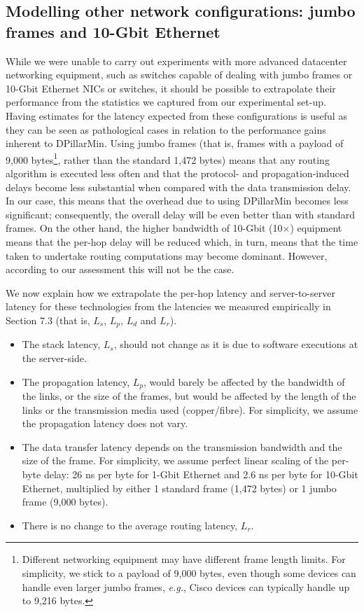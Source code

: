 \documentclass{article}
\newcounter{fig}
\begin{document}
\subsection{Modelling other network configurations: jumbo frames and 10-Gbit Ethernet}
While we were unable to carry out experiments with more advanced datacenter
networking equipment, such as switches capable of dealing with jumbo frames or
10-Gbit Ethernet NICs or switches, it should be possible to extrapolate their
performance from the statistics we captured from our experimental set-up. Having
estimates for the latency expected from these configurations is useful as they
can be seen as pathological cases in relation to the performance gains inherent
to DPillarMin. Using jumbo frames (that is, frames with a payload of 9,000
bytes\footnote{Different networking equipment may have different frame length
  limits. For simplicity, we stick to a payload of 9,000 bytes, even though some
  devices can handle even larger jumbo frames, \emph{e.g.}, Cisco devices can
  typically handle up to 9,216 bytes.}, rather than the standard 1,472 bytes)
means that any routing algorithm is executed less often and that the protocol-
and propagation-induced delays become less substantial when compared with the
data transmission delay. In our case, this means that the overhead due to using
DPillarMin becomes less significant; consequently, the overall delay will be
even better than with standard frames. On the other hand, the higher bandwidth
of 10-Gbit (10$\times$) equipment means that the per-hop delay will be reduced
which, in turn, means that the time taken to undertake routing computations may
become dominant. However, according to our assessment this will not be the case.

We now explain how we extrapolate the per-hop latency and server-to-server latency for these technologies from the latencies we measured empirically in Section 7.3 (that is, $L_s$, $L_p$, $L_d$ and $L_r$).
\begin{itemize}
	\item The stack latency, $L_s$, should not change as it is due to software executions at the server-side. 
	\item The propagation latency, $L_p$, would barely be affected by the bandwidth of the links, or the size of the frames, but would be affected by the length of the links or the transmission media used (copper/fibre). For simplicity, we assume the propagation latency does not vary.
	\item The data transfer latency depends on the transmission bandwidth and the size of the frame. For simplicity, we assume perfect linear scaling of the per-byte delay: 26 ns per byte for 1-Gbit Ethernet and 2.6 ns per byte for 10-Gbit Ethernet, multiplied by either 1 standard frame (1,472 bytes) or 1 jumbo frame (9,000 bytes).
	\item There is no change to the average routing latency, $L_r$.
\end{itemize}
\end{document}
